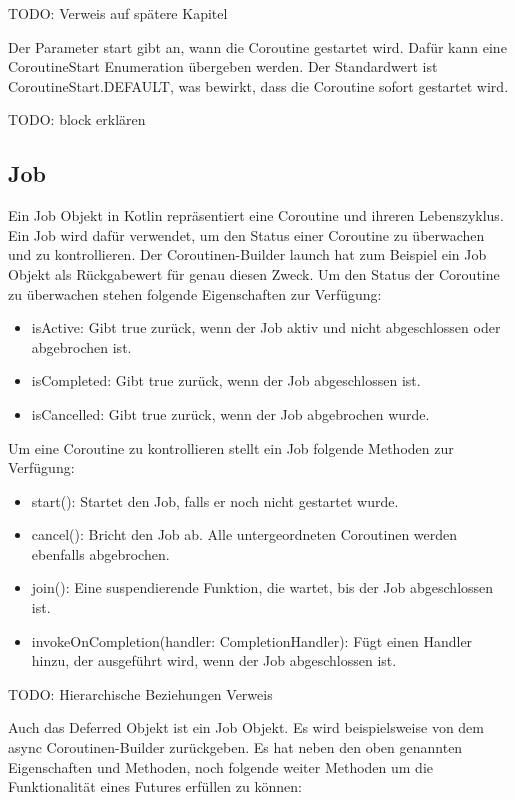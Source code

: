 \documentclass[fontsize=12pt,paper=a4,twoside=semi,parskip=half-,headsepline,headinclude]{scrreprt}
\begin{document}
TODO: Verweis auf spätere Kapitel

Der Parameter start gibt an, wann die Coroutine gestartet wird. Dafür kann eine CoroutineStart Enumeration übergeben werden. Der Standardwert ist CoroutineStart.DEFAULT, was bewirkt, dass die Coroutine sofort gestartet wird.

TODO: block erklären 

\subsection{Job}

Ein Job Objekt in Kotlin repräsentiert eine Coroutine und ihreren Lebenszyklus. Ein Job wird dafür verwendet, um den Status einer Coroutine zu überwachen und zu kontrollieren. Der Coroutinen-Builder launch hat zum Beispiel ein Job Objekt als Rückgabewert für genau diesen Zweck. Um den Status der Coroutine zu überwachen stehen folgende Eigenschaften zur Verfügung:

\begin{itemize}
	\item isActive: Gibt true zurück, wenn der Job aktiv und nicht abgeschlossen oder abgebrochen ist.
	\item isCompleted: Gibt true zurück, wenn der Job abgeschlossen ist.
	\item isCancelled: Gibt true zurück, wenn der Job abgebrochen wurde.
\end{itemize}

Um eine Coroutine zu kontrollieren stellt ein Job folgende Methoden zur Verfügung:

\begin{itemize}
	\item start(): Startet den Job, falls er noch nicht gestartet wurde.
	\item cancel(): Bricht den Job ab. Alle untergeordneten Coroutinen werden ebenfalls abgebrochen.
	\item join(): Eine suspendierende Funktion, die wartet, bis der Job abgeschlossen ist.
	\item invokeOnCompletion(handler: CompletionHandler): Fügt einen Handler hinzu, der ausgeführt wird, wenn der Job abgeschlossen ist.
\end{itemize}

TODO: Hierarchische Beziehungen Verweis

Auch das Deferred Objekt ist ein Job Objekt. Es wird beispielsweise von dem async Coroutinen-Builder zurückgeben. Es hat neben den oben genannten Eigenschaften und Methoden, noch folgende weiter Methoden um die Funktionalität eines Futures erfüllen zu können:
\end{document}
